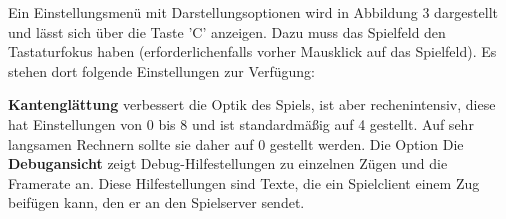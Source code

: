 \documentclass[a4paper, ngerman]{scrartcl}
\begin{document}
	Ein Einstellungsmenü mit Darstellungsoptionen wird in Abbildung 3 dargestellt
	und lässt sich über die Taste 'C' anzeigen. Dazu muss das
Spielfeld den Tastaturfokus haben (erforderlichenfalls
vorher Mausklick auf das Spielfeld). Es stehen dort
folgende Einstellungen zur Verfügung: 

\textbf{Kantenglättung} verbessert die Optik des
Spiels, ist aber rechenintensiv, diese hat Einstellungen von 0 bis 8 und ist
standardmäßig auf 4 gestellt.
Auf sehr langsamen Rechnern sollte sie daher auf 0 gestellt werden. Die Option
Die \textbf{Debugansicht} zeigt Debug-Hilfestellungen zu einzelnen Zügen und
die Framerate an.
Diese Hilfestellungen sind Texte, die ein Spielclient einem Zug beifügen kann, den er
an den Spielserver sendet.
	
\end{document}
